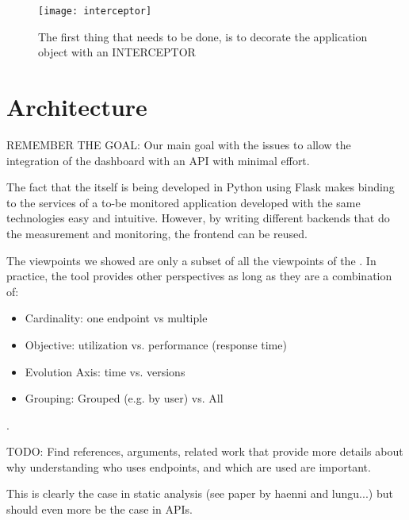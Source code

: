 
    \begin{figure*}[ht!]
      \centering
      \texttt{[image: interceptor]}
      \caption{The first thing that needs to be done, is to decorate the application object with an INTERCEPTOR}
      \label{fig:sep}
    \end{figure*}


\section{Architecture}

REMEMBER THE GOAL: Our main goal with the \tool issues to allow the integration of the dashboard with an API with minimal effort.

The fact that the \tool itself is being developed in Python using Flask makes binding to the services of a to-be monitored application developed with the same technologies easy and intuitive. However, by writing different backends that do the measurement and monitoring, the frontend can be reused. 

The viewpoints we showed are only a subset of all the viewpoints of the \tool. In practice, the tool provides other perspectives as long as they are a combination of: 

\begin{itemize}
  \item Cardinality: one endpoint vs multiple
  \item Objective: utilization vs. performance (response time)
  \item Evolution Axis: time vs. versions
  \item Grouping: Grouped (e.g. by user) vs. All
\end{itemize}






. 

TODO: Find references, arguments, related work
that provide more details about why understanding
who uses endpoints, and which are used are important.

This is clearly the case in static analysis (see paper
by haenni and lungu...) but should even more be the
case in APIs.




  \newpage


